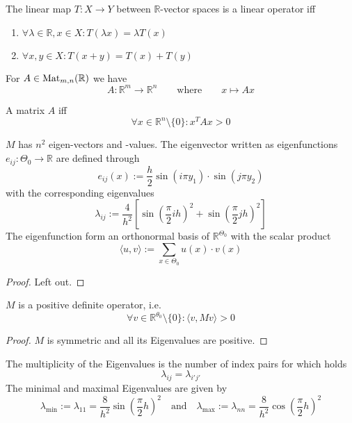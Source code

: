 \begin{definition}
   The linear map \(T: X \to Y\) between \(\mathbb{R}\)-vector spaces is a linear operator iff
   \begin{enumerate}[label=\roman*, align=Center]
      \item \(\forall \lambda \in \mathbb{R}, x \in X: T(\lambda x) = \lambda T(x)\)
      \item \(\forall x, y \in X: T(x + y) = T(x) + T(y)\)
   \end{enumerate}
\end{definition}
\begin{example}
   For \(A \in \operatorname{Mat}_{m,n}(\mathbb{R})\) we have
   \[A: \mathbb{R}^m \to \mathbb{R}^n \qquad\text{where}\qquad x \mapsto Ax\]
\end{example}

\begin{definition}
   A matrix \(A\) iff
   \[\forall x \in \mathbb{R}^n \setminus \{0\}: x^TAx > 0\]
\end{definition}

\begin{lemma}
   \(M\) has \(n^2\) eigen-vectors and -values.
   The eigenvector written as eigenfunctions \(e_{ij}: \Theta_0 \to \mathbb{R}\) are defined through
   \[e_{ij}(x) := \frac{h}{2} \sin(i \pi y_1) \cdot \sin(j \pi y_2)\]
   with the corresponding eigenvalues
   \[\lambda_{ij} := \frac{4}{h^2} \left[\sin\left(\frac{\pi}{2} ih\right)^2 + \sin\left(\frac{\pi}{2} jh\right)^2\right]\]
   The eigenfunction form an orthonormal basis of \(\mathbb{R}^{\Theta_0}\) with the scalar product
   \[\langle u, v \rangle := \sum_{x \in \Theta_0} u(x) \cdot v(x)\]
\end{lemma}
\begin{proof}
   Left out.
\end{proof}

\begin{corollary}
   \(M\) is a positive definite operator, i.e.
   \[\forall v \in \mathbb{R}^{\theta_0} \setminus \{0\}: \langle v, Mv \rangle > 0\]
\end{corollary}
\begin{proof}
   \(M\) is symmetric and all its Eigenvalues are positive.
\end{proof}

\begin{corollary}
   The multiplicity of the Eigenvalues is the number of index pairs for which holds
   \[\lambda_{ij} = \lambda_{i'j'}\]
   The minimal and maximal Eigenvalues are given by
   \[\lambda_{\min} := \lambda_{11} = \frac{8}{h^2} \sin\left(\frac{\pi}{2} h\right)^2 \quad\text{and}\quad \lambda_{\max} := \lambda_{nn} = \frac{8}{h^2} \cos\left(\frac{\pi}{2} h\right)^2\]
\end{corollary}

